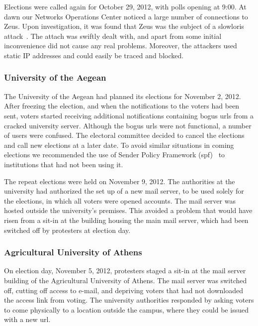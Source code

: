 \documentclass[letterpaper,10pt]{article}
\begin{document}
Elections were called again for October 29, 2012, with polls opening
at 9:00. At dawn our Networks Operations Center noticed a large number
of connections to Zeus. Upon investigation, it was found that Zeus was
the subject of a slowloris attack~\cite{slowloris}. The attach was
swiftly dealt with, and apart from some initial inconvenience did not
cause any real problems. Moreover, the attackers used static IP
addresses and could easily be traced and blocked.

\subsubsection{University of the Aegean}

The University of the Aegean had planned its elections for November 2,
2012. After freezing the election, and when the notifications to the
voters had been sent, voters started receiving additional
notifications containing bogus {\sc url}s from a cracked university server.
Although the bogus {\sc url}s were not functional, a number of users were
confused. The electoral committee decided to cancel the elections and
call new elections at a later date. To avoid similar situations in
coming elections we recommended the use of Sender Policy Framework
({\sc spf})~\cite{rfc4408} to institutions that had not been using it.

The repeat elections were held on November 9, 2012. The authorities at
the university had authorized the set up of a new mail server, to be
used solely for the elections, in which all voters were opened
accounts. The mail server was hosted outside the university's
premises. This avoided a problem that would have risen from a sit-in
at the building housing the main mail server, which had been switched
off by protesters at election day.

\subsubsection{Agricultural University of Athens}

On election day, November 5, 2012, protesters staged a sit-in at the
mail server building of the Agricultural University of Athens. The
mail server was switched off, cutting off access to e-mail, and
depriving voters that had not downloaded the access link from voting.
The university authorities responded by asking voters to come
physically to a location outside the campus, where they could be
issued with a new {\sc url}.
\end{document}
